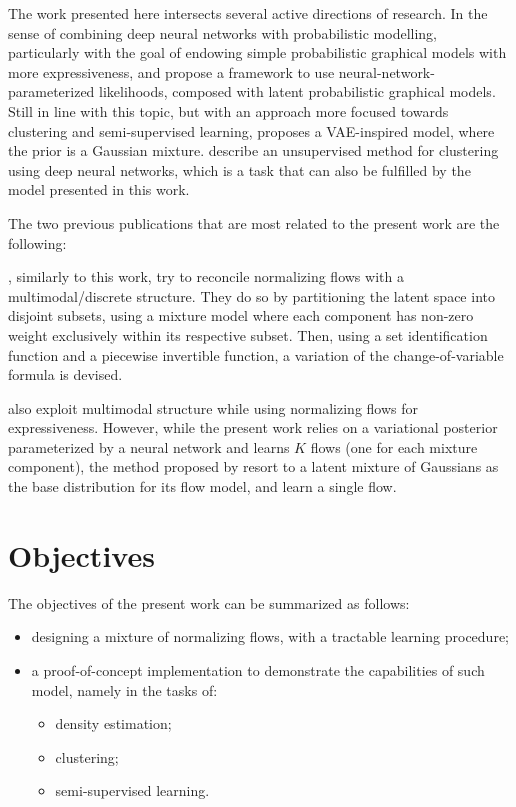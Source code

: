 The work presented here intersects several active directions of research.
In the sense of combining deep neural networks with probabilistic modelling,
particularly with the goal of endowing simple probabilistic graphical models
with more expressiveness, \textcite{svae} and \textcite{lin2018variational} propose a
framework to use neural-network-parameterized likelihoods, composed with latent
probabilistic graphical models. Still in line with this topic, but with an
approach more focused towards clustering and semi-supervised learning, \textcite{gmVAE}
proposes a VAE-inspired model, where the prior is a Gaussian mixture. \textcite{DEC}
describe an unsupervised method for clustering using deep neural networks, which
is a task that can also be fulfilled by the model presented in this work.

The two previous publications that are most related to the present work are
the following:

\textcite{RAD}, similarly to this work, try to reconcile normalizing flows with a
multimodal/discrete structure. They do so by partitioning the latent space into
disjoint subsets, using a mixture model where each component has non-zero
weight exclusively within its respective subset. Then, using a set identification
function and a piecewise invertible function, a variation of the change-of-variable
formula is devised.

\textcite{semisuplearning_nflows} also exploit multimodal structure while
using normalizing flows for expressiveness. However, while the present work relies on
a variational posterior parameterized by a neural network and learns $K$ flows
(one for each mixture component), the method proposed by \textcite{semisuplearning_nflows} resort to a
latent mixture of Gaussians as the base distribution for its flow model, and
learn a single flow.

\section{Objectives}
\label{section:objectives}

The objectives of the present work can be summarized as follows:
\begin{itemize}
    \item designing a mixture of normalizing flows, with a tractable learning procedure;
    \item a proof-of-concept implementation to demonstrate the capabilities of such model, namely in the tasks of:
        \begin{itemize}
        \item density estimation;
        \item clustering;
        \item semi-supervised learning.
        \end{itemize}
\end{itemize}

